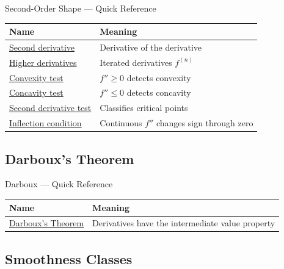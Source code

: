 \begin{toolkitbox}{Second-Order Shape --- Quick Reference}
\small
\begin{tabular}{l l}
\toprule
\textbf{Name} & \textbf{Meaning} \\
\midrule
\hyperref[def:second-derivative]{Second derivative} & Derivative of the derivative \\
\hyperref[def:higher-derivatives]{Higher derivatives} & Iterated derivatives \(f^{(n)}\) \\
\hyperref[thm:second-derivative-convexity-test]{Convexity test} & \(f''\geq 0\) detects convexity \\
\hyperref[thm:second-derivative-concavity-test]{Concavity test} & \(f''\leq 0\) detects concavity \\
\hyperref[thm:second-derivative-test]{Second derivative test} & Classifies critical points \\
\hyperref[prop:inflection-point-necessary-condition]{Inflection condition} & Continuous \(f''\) changes sign through zero \\
\bottomrule
\end{tabular}
\end{toolkitbox}



\subsection{Darboux's Theorem}

\begin{toolkitbox}{Darboux --- Quick Reference}
\small
\begin{tabular}{l l}
\toprule
\textbf{Name} & \textbf{Meaning} \\
\midrule
\hyperref[thm:darboux]{Darboux's Theorem} & Derivatives have the intermediate value property \\
\bottomrule
\end{tabular}
\end{toolkitbox}



\subsection{Smoothness Classes}

